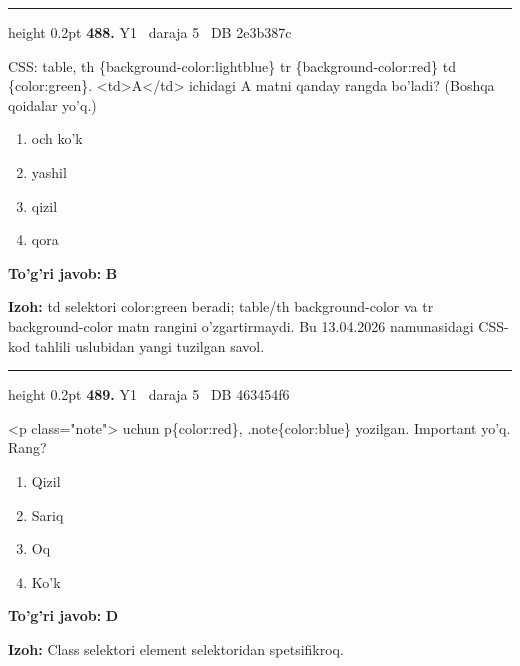 \documentclass[10pt,a4paper,oneside]{article}
\begin{document}
\vspace{2mm}\hrule height 0.2pt \vspace{4mm}
\hypertarget{q488}{\textbf{\color{ink}488.}}  {\color{muted}\scriptsize Y1 \textbullet\ daraja 5 \textbullet\ DB 2e3b387c}
\par
CSS: table, th \{background-color:lightblue\} tr \{background-color:red\} td \{color:green\}. \textless{}td\textgreater{}A\textless{}/td\textgreater{} ichidagi A matni qanday rangda bo'ladi? (Boshqa qoidalar yo'q.)
\begin{enumerate}[label=\Alph*),leftmargin=9mm]
\item och ko'k
\item yashil
\item qizil
\item qora
\end{enumerate}
\begin{tcolorbox}[enhanced,breakable,colback=teal!4,colframe=teal!45!black,boxrule=0.45pt,arc=1.2mm,left=2.8mm,right=2.8mm,top=2mm,bottom=2mm,before skip=2mm,after skip=2mm]
\textbf{\color{teal}To'g'ri javob:} \textbf{B}
\par\smallskip
\textbf{Izoh:} td selektori color:green beradi; table/th background-color va tr background-color matn rangini o'zgartirmaydi. Bu 13.04.2026 namunasidagi CSS-kod tahlili uslubidan yangi tuzilgan savol.
\end{tcolorbox}
\vspace{2mm}\hrule height 0.2pt \vspace{4mm}
\hypertarget{q489}{\textbf{\color{ink}489.}}  {\color{muted}\scriptsize Y1 \textbullet\ daraja 5 \textbullet\ DB 463454f6}
\par
\textless{}p class="note"\textgreater{} uchun p\{color:red\}, .note\{color:blue\} yozilgan. Important yo'q. Rang?
\begin{enumerate}[label=\Alph*),leftmargin=9mm]
\item Qizil
\item Sariq
\item Oq
\item Ko'k
\end{enumerate}
\begin{tcolorbox}[enhanced,breakable,colback=teal!4,colframe=teal!45!black,boxrule=0.45pt,arc=1.2mm,left=2.8mm,right=2.8mm,top=2mm,bottom=2mm,before skip=2mm,after skip=2mm]
\textbf{\color{teal}To'g'ri javob:} \textbf{D}
\par\smallskip
\textbf{Izoh:} Class selektori element selektoridan spetsifikroq.
\end{tcolorbox}
\end{document}
